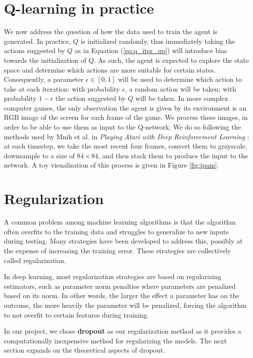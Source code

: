 \newpage
\section{Q-learning in practice}
We now address the question of how the data used to train
the agent is generated. In practice, $Q$ is initialized randomly, thus immediately taking the actions suggested
by $Q$ as in Equation (\ref{eq:q_iter_up}) will introduce bias towards the 
initialization of $Q$. As such, the agent is expected to explore the state space 
and determine which actions are more suitable for certain states. Consequently,
a parameter $\epsilon \in [0,1]$ will be used to determine which action to take
at each iteration: with probability $\epsilon$, a random action will be taken; 
with probability $1 - \epsilon$ the action suggested by $Q$ will be taken. In more complex computer games, the only observation the agent is given 
by its environment is an RGB image of the screen for each frame of the game. We process these images, 
in order to be able to use them as input to the Q-network. We do so following the methods used by Mnih et al. in \textit{Playing Atari with Deep Reinforcement Learning} \cite{mnih2013playing}:
at each timestep, we take the most recent four frames, convert them to grayscale, downsample to a size 
of $84\times 84$, and then stack them to produce the input to the network. A toy visualization of this process is given in
Figure \ref{fig:ipam}.

\section{Regularization}\label{reg}
A common problem among machine learning algorithms is 
that the algorithm often overfits to the training data 
and struggles to generalize to new inputs during testing. 
Many strategies have been developed to address this, possibly at the expense of increasing the training 
error. These strategies are collectively called regularization. 
\par
In deep learning, most regularization strategies are based on 
regularizing estimators, such as parameter norm penalties where 
parameters are penalized based on its norm. In other words, the 
larger the effect a parameter has on the outcome, the more heavily 
the parameter will be penalized, forcing the algorithm to not 
overfit to certain features during training. 
\par
In our project, we chose \textbf{dropout} as our regularization method as
it provides a computationally inexpensive method for 
regularizing the models. The next section expands on the
theoretical aspects of dropout.

